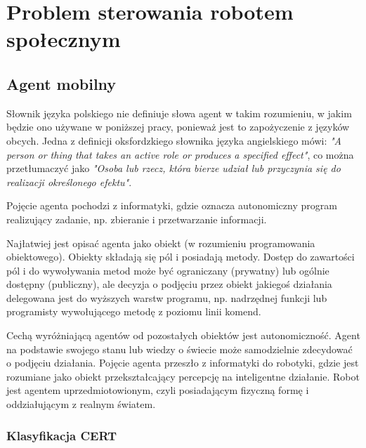 \chapter{Problem sterowania robotem społecznym}

\section{Agent mobilny}
Słownik języka polskiego nie definiuje słowa agent w takim rozumieniu, w jakim będzie ono używane w poniższej pracy, ponieważ jest to zapożyczenie z języków obcych. Jedna z definicji oksfordzkiego słownika języka angielskiego mówi: \textit{"A person or thing that takes an active role or produces a specified effect"}, co można przetłumaczyć jako \textit{"Osoba lub rzecz, która bierze udział lub przyczynia się do realizacji określonego efektu"}. 

Pojęcie agenta pochodzi z informatyki, gdzie oznacza autonomiczny program realizujący zadanie, np. zbieranie i przetwarzanie informacji.

Najłatwiej jest opisać agenta jako obiekt (w rozumieniu programowania obiektowego). Obiekty składają się pól i posiadają metody. Dostęp do zawartości pól i do wywoływania metod może być ograniczany (prywatny) lub ogólnie dostępny (publiczny), ale decyzja o podjęciu przez obiekt jakiegoś działania delegowana jest do wyższych warstw programu, np. nadrzędnej funkcji lub programisty wywołującego metodę z poziomu linii komend. 

Cechą wyróżniającą agentów od pozostałych obiektów jest autonomiczność. Agent na podstawie swojego stanu lub wiedzy o świecie może samodzielnie zdecydować o podjęciu działania. Pojęcie agenta przeszło z informatyki do robotyki, gdzie jest rozumiane jako obiekt przekształcający percepcję na inteligentne działanie. Robot jest agentem uprzedmiotowionym, czyli posiadającym fizyczną formę i oddziałującym z realnym światem.

\subsection{Klasyfikacja CERT}


